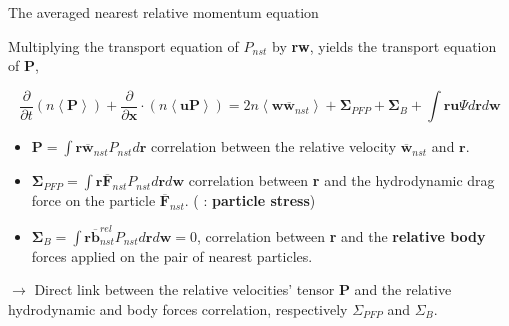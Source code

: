 \documentclass{sintefbeamer}
\newcommand{\pavg}[1]{n \left<#1\right>}
\newcommand{\nstavg}[1]{\overline{#1}_{nst}}
\newcommand{\nstrelavg}[1]{\overline{#1}_{nst}^{rel}}
\newcommand{\pddt}{\frac{\partial}{\partial t}}
\begin{document}
\begin{frame}{The averaged nearest relative momentum equation}
  
  Multiplying the transport equation of $P_{nst}$ by \textbf{rw}, yields the transport equation of $\textbf{P}$, 
  
  
  \begin{equation*}
    \pddt (\pavg{\textbf{P}})
    + \frac{\partial}{\partial\textbf{x}} \cdot
    (\pavg{\textbf{uP}})
    = 2\pavg{\textbf{w}\nstavg{\textbf{w}}}
    + \mathbf{\Sigma}_{PFP}
    + \mathbf{\Sigma}_{B}
    + \int \textbf{ru} \Psi d\textbf{r}d\textbf{w}
  \end{equation*}
  
  \begin{itemize}
      \item $\textbf{P} = \int \textbf{r} \nstavg{\textbf{w}} P_{nst} d\textbf{r}$ correlation between the relative velocity $\nstavg{\textbf{w}}$ and $\textbf{r}$. 
    \item $\mathbf{\Sigma}_{PFP} = \int \textbf{r} \nstavg{\textbf{F}} P_{nst} d\textbf{r}d\textbf{w}$ correlation between \textbf{r} and the hydrodynamic  drag force on the particle $\nstavg{\textbf{F}}$. (\citet{zhang2021ensemble} : \textbf{particle stress})
    \item $\mathbf{\Sigma}_{B} = \int \textbf{r} \nstrelavg{\textbf{b}} P_{nst} d\textbf{r}d\textbf{w} = 0$, correlation between \textbf{r} and the \textbf{relative body} forces applied on the pair of nearest particles.
  \end{itemize}
  
  $\rightarrow$  Direct link between the relative velocities' tensor \textbf{P} and the relative hydrodynamic and body forces correlation, respectively $\Sigma_{PFP}$ and $\Sigma_B$.
  \end{frame}
  
\end{document}
